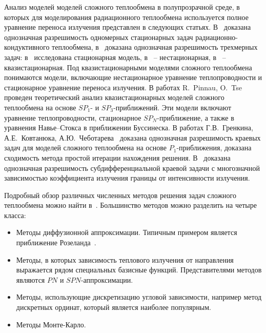     Анализ моделей моделей сложного теплообмена в полупрозрачной среде, в
    которых для моделирования радиационного теплообмена используется
    полное уравнение переноса излучения представлен в следующих статьях.
    В~\cite{asllanaj2003existence, kelley1996existence} доказана
    однозначная разрешимость одномерных стационарных
    задач радиационно-кондуктивного теплообмена,
    в~\cite{ghattassi2018existence, Porzio2004, Thompson2004} доказана
    однозначная разрешимость трехмерных задач: в~\cite{Thompson2004} исследована
    стационарная модель, в~\cite{Porzio2004} -- нестационарная,
    в~\cite{ghattassi2018existence} -- квазистационарная.
    Под квазистационарными моделями сложного теплообмена понимаются
    модели, включающие нестационарное уравнение теплопроводности и
    стационарное уравнение переноса излучения.
    В работах R.\ Pinnau, O.\ Tse~\cite{Pinnau2007, Pinnau2013}
    проведен теоретический анализ квазистационарных моделей сложного
    теплообмена на основе $SP_1$- и $SP_3$-приближений.
    Эти модели включают уравнение теплопроводности, стационарное $SP_N$-приближение, а также
    в~\cite{Pinnau2013} уравнения Навье–Стокса в приближении Буссинеска.
    В работах Г.В.\ Гренкина, А.Е.\ Ковтанюка,
    А.Ю.\ Чеботарева~\cite{Kovtanyuk2014, Kovtanyuk2016, Amosov16}
    доказана однозначная разрешимость краевых задач для моделей
    сложного теплообмена на основе $P_1$-приближения, доказана сходимость
    метода простой итерации нахождения решения.
    В~\cite{Chebotarev2016Odnaznachnaya} доказана однозначная
    разрешимость субдифференциальной краевой задачи с многозначной
    зависимостью коэффициента излучения границы от интенсивности
    излучения.

    Подробный обзор различных численных методов решения задач сложного
    теплообмена можно найти в~\cite{modest2013radiative}.
    Большинство методов можно разделить на четыре класса:
    \begin{itemize}
        \item Методы диффузионной аппроксимации.
        Типичным примером является приближение Розеланда~\cite{farina2011mathematical, Siedow2011}.
        \item Методы, в которых зависимость теплового излучения от направления
        выражается рядом специальных базисные функций.
        Представителями методов являются $PN$ и $SPN$-аппроксимации.
        \item Методы, использующие дискретизацию угловой зависимости, например
        метод дискретных ординат, который является наиболее популярным.
        \item Методы Монте-Карло.
    \end{itemize}


